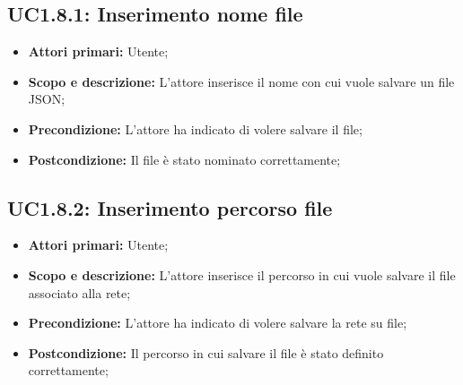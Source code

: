 \subsection{UC1.8.1: Inserimento nome file} 
\begin{itemize} 
	\item{\textbf{Attori primari:} Utente;} 
	\item{\textbf{Scopo e descrizione:} L'attore inserisce il nome con cui vuole salvare un file JSON;} 
	\item{\textbf{Precondizione:} L'attore ha indicato di volere salvare il file;} 
	\item{\textbf{Postcondizione:} Il file è stato nominato correttamente;} 
\end{itemize} 
\subsection{UC1.8.2: Inserimento percorso file} 
\begin{itemize} 
	\item{\textbf{Attori primari:} Utente;} 
	\item{\textbf{Scopo e descrizione:} L'attore inserisce il percorso in cui vuole salvare il file associato alla rete;} 
	\item{\textbf{Precondizione:} L'attore ha indicato di volere salvare la rete su file;} 
	\item{\textbf{Postcondizione:} Il percorso in cui salvare il file è stato definito correttamente;} 
\end{itemize} 
